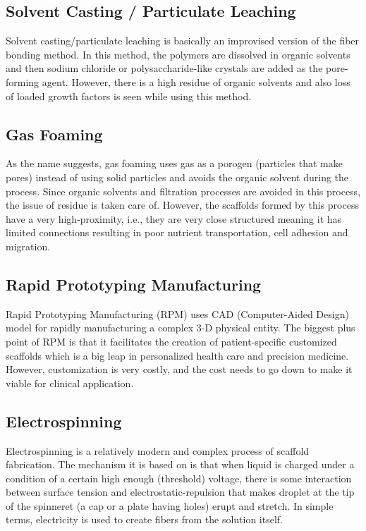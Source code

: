 \documentclass[12pt]{article}
\begin{document}
\subsection{Solvent Casting / Particulate Leaching}
Solvent casting/particulate leaching is basically an improvised version of the fiber bonding method. In this method, the polymers are dissolved in organic solvents and then sodium chloride or polysaccharide-like crystals are added as the pore-forming agent. However, there is a high residue of organic solvents and also loss of loaded growth factors is seen while using this method.

\subsection{Gas Foaming}
As the name suggests, gas foaming uses gas as a porogen (particles that make pores) instead of using solid particles and avoids the organic solvent during the process. Since organic solvents and filtration processes are avoided in this process, the issue of residue is taken care of. However, the scaffolds formed by this process have a very high-proximity, i.e., they are very close structured meaning it has limited connections resulting in poor nutrient transportation, cell adhesion and migration.

\subsection{Rapid Prototyping Manufacturing}
Rapid Prototyping Manufacturing (RPM) uses CAD (Computer-Aided Design) model for rapidly manufacturing a complex 3-D physical entity. The biggest plus point of RPM is that it facilitates the creation of patient-specific customized scaffolds which is a big leap in personalized health care and precision medicine. However, customization is very costly, and the cost needs to go down to make it viable for clinical application.

\subsection{Electrospinning}
Electrospinning is a relatively modern and complex process of scaffold fabrication. The mechanism it is based on is that when liquid is charged under a condition of a certain high enough (threshold) voltage, there is some interaction between surface tension and electrostatic-repulsion that makes droplet at the tip of the spinneret (a cap or a plate having holes) erupt and stretch. In simple terms, electricity is used to create fibers from the solution itself.
\clearpage
\end{document}
